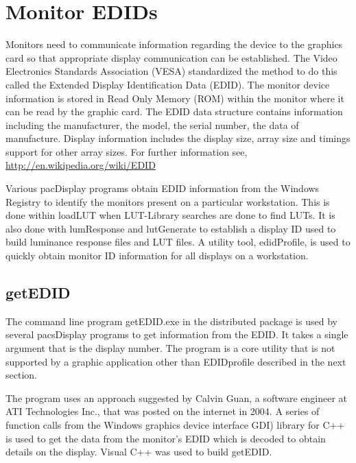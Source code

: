 %

\section{Monitor EDIDs}

Monitors need to communicate information regarding the device to the graphics card so that appropriate display communication can be established. The Video Electronics Standards Association (VESA) standardized the method to do this called the Extended Display Identification Data (EDID). The monitor device information is stored in Read Only Memory (ROM) within the monitor where it can be read by the graphic card. The EDID data structure contains information including the manufacturer, the model, the serial number, the data of manufacture. Display information includes the display size, array size and timings support for other array sizes. For further information see, \href{http://en.wikipedia.org/wiki/Extended_display_identification_data}{http://en.wikipedia.org/wiki/EDID}

Various pacDisplay programs obtain EDID information from the Windows Registry to identify the monitors present on a particular workstation. This is done within loadLUT when LUT-Library searches are done to find LUTs. It is also done with lumResponse and lutGenerate to establish a display ID used to build luminance response files and LUT files. A utility tool, edidProfile, is used to quickly obtain monitor ID information for all displays on a workstation. 

\subsection{getEDID}

The command line program \textnormal{getEDID.exe} in the distributed package is used by several pacsDisplay programs to get information from the EDID. It takes a single argument that is the display number. The program is a core utility that is not supported by a graphic application other than EDIDprofile described in the next section. 

The program uses an approach suggested by Calvin Guan, a software engineer at ATI Technologies Inc., that was posted on the internet in 2004. A series of function calls from the Windows graphics device interface GDI) library for C++ is used to get the data from the monitor’s EDID which is decoded to obtain details on the display. Visual C++ was used to build getEDID. 

